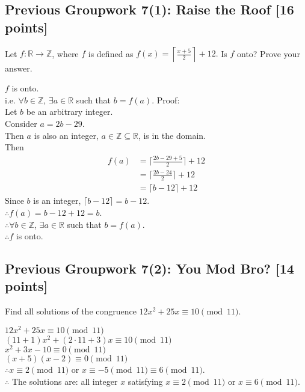 \documentclass[12pt]{exam}
\begin{document}
\subsection*{Previous Groupwork 7(1): Raise the Roof [16 points]}
Let $f\colon \mathbb R \rightarrow \mathbb Z$, where $f$ is defined as $f(x)= \left \lceil \frac{ x+5 }{2} \right \rceil + 12.$ Is $f$ onto? Prove your answer.

\begin{solution}
    $f$ is onto.\\
    i.e. $\forall b \in \mathbb{Z}$, $\exists a \in \mathbb{R}$ such that $b = f(a)$.
    Proof:\\
    Let $b$ be an arbitrary integer.\\
    Consider $a = 2b -29$.\\
    Then $a$ is also an integer, $a \in \mathbb{Z} \subseteq \mathbb{R}$, is in the domain.\\
    Then
    \begin{align*}
        f(a)  &= \lceil \frac{ 2b - 29+5 }{2}\rceil + 12\\
              &= \lceil \frac{ 2b - 24 }{2} \rceil + 12\\
              &= \lceil b - 12 \rceil + 12
    \end{align*} 
    Since $b$ is an integer, $\lceil b - 12 \rceil = b -12$.\\
    $\therefore f(a) = b - 12 + 12 = b$.\\
    $\therefore \forall b \in \mathbb{Z}$, $\exists a \in \mathbb{R}$ such that $b = f(a)$.\\
    $\therefore f$ is onto.
\end{solution}

\subsection*{Previous Groupwork 7(2):  You Mod Bro? [14 points]}
Find all solutions of the congruence $12x^2 + 25x \equiv 10 \pmod{11}$.
\begin{solution}
    $12x^2 + 25x \equiv 10 \pmod{11}$\\
    $(11+1)x^2 + (2 \cdot 11 +3)x \equiv 10 \pmod{11}$\\
    $x^2 + 3x - 10 \equiv 0 \pmod{11}$\\
    $(x+5)(x-2) \equiv 0 \pmod{11}$ \\
    $\therefore x \equiv 2 \pmod{11}$ or $x \equiv -5 \pmod{11}\equiv 6 \pmod{11}$.\\
    $\therefore$ The solutions are: all integer $x$ satisfying $x \equiv 2 \pmod{11}$ or $x\equiv 6 \pmod{11}$.
\end{solution}
\end{document}
